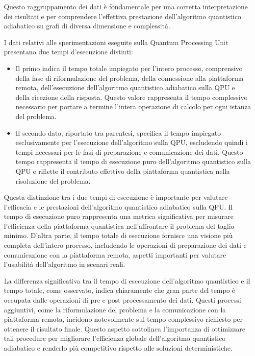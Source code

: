 \documentclass{article}
\begin{document}
Questo raggruppamento dei dati è fondamentale per una corretta interpretazione dei risultati e per comprendere l'effettiva prestazione dell'algoritmo quantistico adiabatico su grafi di diversa dimensione e complessità.

I dati relativi alle sperimentazioni eseguite sulla Quantum Processing Unit presentano due tempi d'esecuzione distinti:

\begin{itemize}
    \item Il primo indica il tempo totale impiegato per l'intero processo, comprensivo della fase di riformulazione del problema, della connessione alla piattaforma remota, dell'esecuzione dell'algoritmo quantistico adiabatico sulla QPU e della ricezione della risposta. Questo valore rappresenta il tempo complessivo necessario per portare a termine l'intera operazione di calcolo per ogni istanza del problema.
    \item Il secondo dato, riportato tra parentesi, specifica il tempo impiegato esclusivamente per l'esecuzione dell'algoritmo sulla QPU, escludendo quindi i tempi necessari per le fasi di preparazione e comunicazione dei dati. Questo tempo rappresenta il tempo di esecuzione puro dell'algoritmo quantistico sulla QPU e riflette il contributo effettivo della piattaforma quantistica nella risoluzione del problema.
\end{itemize}

Questa distinzione tra i due tempi di esecuzione è importante per valutare l'efficacia e le prestazioni dell'algoritmo quantistico adiabatico sulla QPU. Il tempo di esecuzione puro rappresenta una metrica significativa per misurare l'efficienza della piattaforma quantistica nell'affrontare il problema del taglio minimo. D'altra parte, il tempo totale di esecuzione fornisce una visione più completa dell'intero processo, includendo le operazioni di preparazione dei dati e comunicazione con la piattaforma remota, aspetti importanti per valutare l'usabilità dell'algoritmo in scenari reali.

La differenza significativa tra il tempo di esecuzione dell'algoritmo quantistico e il tempo totale, come osservato, indica chiaramente che gran parte del tempo è occupata dalle operazioni di pre e post processamento dei dati. Questi processi aggiuntivi, come la riformulazione del problema e la comunicazione con la piattaforma remota, incidono notevolmente sul tempo complessivo richiesto per ottenere il risultato finale. Questo aspetto sottolinea l'importanza di ottimizzare tali procedure per migliorare l'efficienza globale dell'algoritmo quantistico adiabatico e renderlo più competitivo rispetto alle soluzioni deterministiche.
\end{document}
